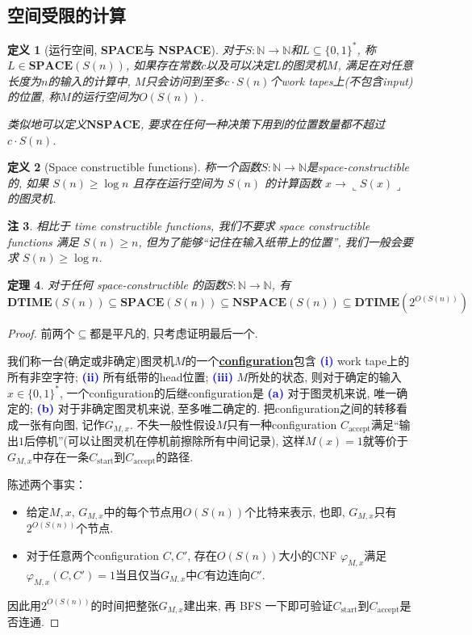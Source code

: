 \documentclass[8pt]{article}
\theoremstyle{compact}
\newtheorem{theorem}{定理}[section]
\newtheorem{definition}[theorem]{定义}
\newtheorem{remark}[theorem]{注}
\def\obj#1{\textbf{\uline{#1}}}
\def\num#1{\textnormal{\textbf{\mbox{\textcolor{blue}{(#1)}}}}}
\def\ge{\geqslant}
\def\rep#1{\llcorner{#1}\lrcorner}
\def\DTIME{\textbf{DTIME}}
\def\SPACE{\textbf{SPACE}}
\def\NSPACE{\textbf{NSPACE}}
\begin{document}
\subsection{空间受限的计算}
\begin{definition}[运行空间, \SPACE 与 \NSPACE]
	对于$S: \mathbb N \to \mathbb N$和$L \subseteq \{0, 1\}^*$, 称$L \in \SPACE(S(n))$, 如果存在常数$c$以及可以决定$L$的图灵机$M$, 满足在对任意长度为$n$的输入的计算中, $M$只会访问到至多$c \cdot S(n)$个work tapes上(不包含input)的位置, 称$M$的运行空间为$O(S(n))$. 

	类似地可以定义$\NSPACE$, 要求在任何一种决策下用到的位置数量都不超过$c \cdot S(n)$. 
\end{definition}
\begin{definition}[Space constructible functions]
	称一个函数$S: \mathbb N \to \mathbb N$是space-constructible的, 如果 $S(n) \ge \log n$ 且存在运行空间为 $S(n)$ 的计算函数 $x \to \rep{S(x)}$ 的图灵机.
\end{definition}
\begin{remark}
	相比于 time constructible functions, 我们不要求 space constructible functions 满足 $S(n) \ge n$, 但为了能够“记住在输入纸带上的位置”, 我们一般会要求 $S(n) \ge \log n$. 
\end{remark}
\begin{theorem}
	对于任何 space-constructible 的函数$S: \mathbb N \to \mathbb N$, 有
	$$\DTIME(S(n)) \subseteq \SPACE(S(n)) \subseteq \NSPACE(S(n)) \subseteq \DTIME(2^{O(S(n))})$$
	\label{time_and_space}
\end{theorem}
\begin{proof}
	前两个$\subseteq$都是平凡的, 只考虑证明最后一个. 

	我们称一台(确定或非确定)图灵机$M$的一个\obj{configuration}包含 \num{i} work tape上的所有非空字符; \num{ii} 所有纸带的head位置; \num{iii} $M$所处的状态, 则对于确定的输入$x \in \{0, 1\}^*$, 一个configuration的后继configuration是 \num{a} 对于图灵机来说, 唯一确定的; \num{b} 对于非确定图灵机来说, 至多唯二确定的. 把configuration之间的转移看成一张有向图, 记作$G_{M, x}$. 不失一般性假设$M$只有一种configuration $C_{\text{accept}}$满足“输出$1$后停机”(可以让图灵机在停机前擦除所有中间记录), 这样$M(x) = 1$就等价于$G_{M, x}$中存在一条$C_{\text{start}}$到$C_{\text{accept}}$的路径. 

	陈述两个事实：
	\begin{itemize}
		\item 给定$M, x$, $G_{M, x}$中的每个节点用$O(S(n))$个比特来表示, 也即, $G_{M, x}$只有$2^{O(S(n))}$个节点. 
		\item 对于任意两个configuration $C, C'$, 存在$O(S(n))$大小的CNF $\varphi_{M, x}$满足$\varphi_{M, x}(C, C') = 1$当且仅当$G_{M, x}$中$C$有边连向$C'$. 
	\end{itemize}

	因此用$2^{O(S(n))}$的时间把整张$G_{M, x}$建出来, 再 BFS 一下即可验证$C_{\text{start}}$到$C_{\text{accept}}$是否连通. 
\end{proof}
\end{document}
